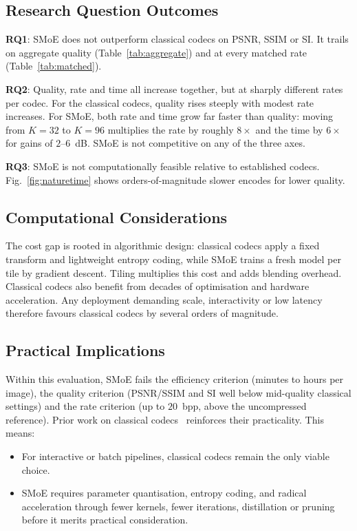 \documentclass[conference]{IEEEtran}
\begin{document}
\subsection{Research Question Outcomes}
\textbf{RQ1}: SMoE does not outperform classical codecs on PSNR, SSIM or SI. It trails on aggregate quality (Table~\ref{tab:aggregate}) and at every matched rate (Table~\ref{tab:matched}).

\textbf{RQ2}: Quality, rate and time all increase together, but at sharply different rates per codec. For the classical codecs, quality rises steeply with modest rate increases. For SMoE, both rate and time grow far faster than quality: moving from $K=32$ to $K=96$ multiplies the rate by roughly $8\times$ and the time by $6\times$ for gains of $2$--$6$~dB. SMoE is not competitive on any of the three axes.

\textbf{RQ3}: SMoE is not computationally feasible relative to established codecs. Fig.~\ref{fig:naturetime} shows orders-of-magnitude slower encodes for lower quality.

\subsection{Computational Considerations}
The cost gap is rooted in algorithmic design: classical codecs apply a fixed transform and lightweight entropy coding, while SMoE trains a fresh model per tile by gradient descent. Tiling multiplies this cost and adds blending overhead. Classical codecs also benefit from decades of optimisation and hardware acceleration. Any deployment demanding scale, interactivity or low latency therefore favours classical codecs by several orders of magnitude.

\subsection{Practical Implications}
Within this evaluation, SMoE fails the efficiency criterion (minutes to hours per image), the quality criterion (PSNR/SSIM and SI well below mid-quality classical settings) and the rate criterion (up to $20$~bpp, above the uncompressed reference). Prior work on classical codecs~\cite{bojkovic2001,satone2017} reinforces their practicality. This means:
\begin{itemize}
    \item For interactive or batch pipelines, classical codecs remain the only viable choice.
    \item SMoE requires parameter quantisation, entropy coding, and radical acceleration through fewer kernels, fewer iterations, distillation or pruning before it merits practical consideration.
\end{itemize}
\end{document}
